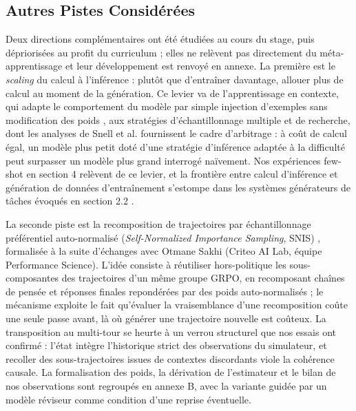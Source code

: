 \documentclass[11pt,a4paper]{article}
\begin{document}
\subsection{Autres Pistes Considérées}

Deux directions complémentaires ont été étudiées au cours du stage, puis dépriorisées au profit du curriculum ; elles ne relèvent pas directement du méta-apprentissage et leur développement est renvoyé en annexe. La première est le \emph{scaling} du calcul à l'inférence : plutôt que d'entraîner davantage, allouer plus de calcul au moment de la génération. Ce levier va de l'apprentissage en contexte, qui adapte le comportement du modèle par simple injection d'exemples sans modification des poids \cite{brown2020gpt3}, aux stratégies d'échantillonnage multiple et de recherche, dont les analyses de Snell et al. \cite{snell2024scaling} fournissent le cadre d'arbitrage : à coût de calcul égal, un modèle plus petit doté d'une stratégie d'inférence adaptée à la difficulté peut surpasser un modèle plus grand interrogé naïvement. Nos expériences few-shot en section 4 relèvent de ce levier, et la frontière entre calcul d'inférence et génération de données d'entraînement s'estompe dans les systèmes générateurs de tâches évoqués en section 2.2 \cite{zhou2025sca, dreamgym2025}.

La seconde piste est la recomposition de trajectoires par échantillonnage préférentiel auto-normalisé (\emph{Self-Normalized Importance Sampling}, SNIS) \cite[chap.~9]{owen2013montecarlo}, formalisée à la suite d'échanges avec Otmane Sakhi (Criteo AI Lab, équipe Performance Science). L'idée consiste à réutiliser hors-politique les sous-composantes des trajectoires d'un même groupe GRPO, en recomposant chaînes de pensée et réponses finales repondérées par des poids auto-normalisés ; le mécanisme exploite le fait qu'évaluer la vraisemblance d'une recomposition coûte une seule passe avant, là où générer une trajectoire nouvelle est coûteux. La transposition au multi-tour se heurte à un verrou structurel que nos essais ont confirmé : l'état intègre l'historique strict des observations du simulateur, et recoller des sous-trajectoires issues de contextes discordants viole la cohérence causale. La formalisation des poids, la dérivation de l'estimateur et le bilan de nos observations sont regroupés en annexe B, avec la variante guidée par un modèle réviseur comme condition d'une reprise éventuelle.
\end{document}
